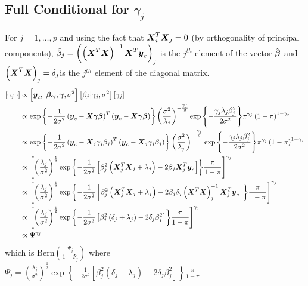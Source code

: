 \documentclass[fleqn]{article}
\def\bm#1{\mbox{\boldmath $#1$}}
\begin{document}
\subsection{Full Conditional for $\gamma_j$}
%
For $j = 1, \ldots, p$ and using the fact that $\bm{X}_i^T \bm{X}_j = 0$ (by orthogonality of principal components), $\hat{\beta}_j = \left( \left( \bm{X}^T \bm{X} \right)^{ - 1} \bm{X}^T \bm{y}_c \right)_j$ is the $j^{th}$ element of the vector $\hat{\bm{\beta}}$ and $\left( \bm{X}^T \bm{X} \right)_{j} = \delta_j$is the $j^{th}$ element of the diagonal matrix. 
%
\begin{align*}
%
\left[ \gamma_j \middle| \cdot \right] & \propto \left[ \bm{y}_c, \middle| \bm{\beta}_{\bm{\gamma}}, \bm{\gamma}, \sigma^2 \right] \left[ \beta_j \middle| \gamma_j, \sigma^2 \right] \left[ \gamma_j \right] \\
%
& \propto \exp{ \left\{ - \frac{1} {2 \sigma^2} \left( \bm{y}_c - \bm{X} \bm{\gamma} \bm{\beta} \right)^T \left( \bm{y}_c - \bm{X} \bm{\gamma} \bm{\beta} \right) \right\} } \left( \frac{\sigma^2} {\lambda_j} \right)^{ - \frac{\gamma_j} {2} } \exp{ \left\{ - \frac{\gamma_j \lambda_j \beta_j^2} {2 \sigma^2} \right\} } \pi^{\gamma_j} \left( 1 - \pi \right)^{1 - \gamma_j} \\
%
& \propto \exp{ \left\{ - \frac{1} {2 \sigma^2} \left( \bm{y}_c - \bm{X}_{j} \gamma_j \beta_j \right)^T \left( \bm{y}_c - \bm{X}_{j} \gamma_j \beta_j \right) \right\} } \left( \frac{\sigma^2} {\lambda_j} \right)^{ - \frac{\gamma_j} {2} } \exp{ \left\{ - \frac{\gamma_j \lambda_j \beta_j^2} {2 \sigma^2} \right\} } \pi^{\gamma_j} \left( 1 - \pi \right)^{1 - \gamma_j} \\
%
& \propto \left[ \left( \frac{\lambda_j} {\sigma^2} \right)^{ \frac{1} {2} } \exp{ \left\{ - \frac{1} {2 \sigma^2} \left[ \beta_j^2 \left( \bm{X}_{j}^T \bm{X}_{j} + \lambda_j \right) - 2 \beta_j \bm{X}_{j}^T \bm{y}_c \right] \right\} } \frac{\pi} {1 - \pi }\right]^{\gamma_j} \\
%
& \propto \left[ \left( \frac{\lambda_j} {\sigma^2} \right)^{ \frac{1} {2} } \exp{ \left\{ - \frac{1} {2 \sigma^2} \left[ \beta_j^2 \left( \bm{X}_{j}^T \bm{X}_{j} + \lambda_j \right) - 2 \beta_j \delta_j \left( \bm{X}^T \bm{X} \right)^{ - 1}_j \bm{X}_{j}^T \bm{y}_c \right] \right\} } \frac{\pi} {1 - \pi }\right]^{\gamma_j} \\
%
& \propto \left[ \left( \frac{\lambda_j} {\sigma^2} \right)^{ \frac{1} {2} } \exp{ \left\{ - \frac{1} {2 \sigma^2} \left[ \beta_j^2 \left( \delta_j + \lambda_j \right) - 2 \delta_j \beta_j^2 \right] \right\} } \frac{\pi} {1 - \pi } \right]^{\gamma_j} \\
%
& \propto \Psi^{\gamma_j}
%
\end{align*}
%
which is Bern$\left( \frac{\Psi_j} {1 + \Psi_j} \right)$ where $\Psi_j =  \left( \frac{\lambda_j} {\sigma^2} \right)^{ \frac{1} {2} } \exp{ \left\{ - \frac{1} {2 \sigma^2} \left[ \beta_j^2 \left( \delta_j + \lambda_j \right) - 2 \delta_j \beta_j^2 \right] \right\} } \frac{\pi} {1 - \pi }$
%
\end{document}
